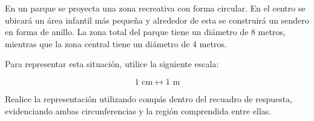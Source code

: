 En un parque se proyecta una zona recreativa con forma circular. En el centro se ubicará un área infantil más pequeña y alrededor de esta se construirá un sendero en forma de anillo. La zona total del parque tiene un diámetro de 8 metros, mientras que la zona central tiene un diámetro de 4 metros.

Para representar esta situación, utilice la siguiente escala:

\[
1 \text{ cm} \leftrightarrow 1 \text{ m}
\]

Realice la representación utilizando compás dentro del recuadro de respuesta, evidenciando ambas circunferencias y la región comprendida entre ellas.